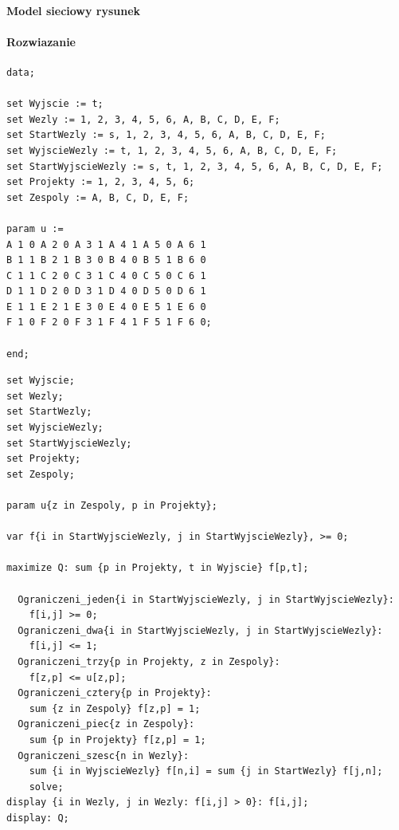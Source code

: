 \paragraph{Model sieciowy rysunek}

\paragraph{Rozwiazanie}
\begin{lstlisting}[caption= plik dat]
data; 
 
set Wyjscie := t; 
set Wezly := 1, 2, 3, 4, 5, 6, A, B, C, D, E, F; 
set StartWezly := s, 1, 2, 3, 4, 5, 6, A, B, C, D, E, F; 
set WyjscieWezly := t, 1, 2, 3, 4, 5, 6, A, B, C, D, E, F; 
set StartWyjscieWezly := s, t, 1, 2, 3, 4, 5, 6, A, B, C, D, E, F; 
set Projekty := 1, 2, 3, 4, 5, 6; 
set Zespoly := A, B, C, D, E, F; 
 
param u := 
A 1 0 A 2 0 A 3 1 A 4 1 A 5 0 A 6 1
B 1 1 B 2 1 B 3 0 B 4 0 B 5 1 B 6 0 
C 1 1 C 2 0 C 3 1 C 4 0 C 5 0 C 6 1 
D 1 1 D 2 0 D 3 1 D 4 0 D 5 0 D 6 1 
E 1 1 E 2 1 E 3 0 E 4 0 E 5 1 E 6 0 
F 1 0 F 2 0 F 3 1 F 4 1 F 5 1 F 6 0; 
 
end; 
\end{lstlisting}
\begin{lstlisting}[caption= plik mod]
set Wyjscie; 
set Wezly; 
set StartWezly; 
set WyjscieWezly; 
set StartWyjscieWezly; 
set Projekty; 
set Zespoly; 
 
param u{z in Zespoly, p in Projekty}; 
 
var f{i in StartWyjscieWezly, j in StartWyjscieWezly}, >= 0; 
 
maximize Q: sum {p in Projekty, t in Wyjscie} f[p,t]; 
 
  Ograniczeni_jeden{i in StartWyjscieWezly, j in StartWyjscieWezly}: 
    f[i,j] >= 0; 
  Ograniczeni_dwa{i in StartWyjscieWezly, j in StartWyjscieWezly}: 
    f[i,j] <= 1; 
  Ograniczeni_trzy{p in Projekty, z in Zespoly}: 
    f[z,p] <= u[z,p]; 
  Ograniczeni_cztery{p in Projekty}: 
    sum {z in Zespoly} f[z,p] = 1; 
  Ograniczeni_piec{z in Zespoly}: 
    sum {p in Projekty} f[z,p] = 1; 
  Ograniczeni_szesc{n in Wezly}: 
    sum {i in WyjscieWezly} f[n,i] = sum {j in StartWezly} f[j,n]; 
	solve; 
display {i in Wezly, j in Wezly: f[i,j] > 0}: f[i,j]; 
display: Q;


\end{lstlisting}
